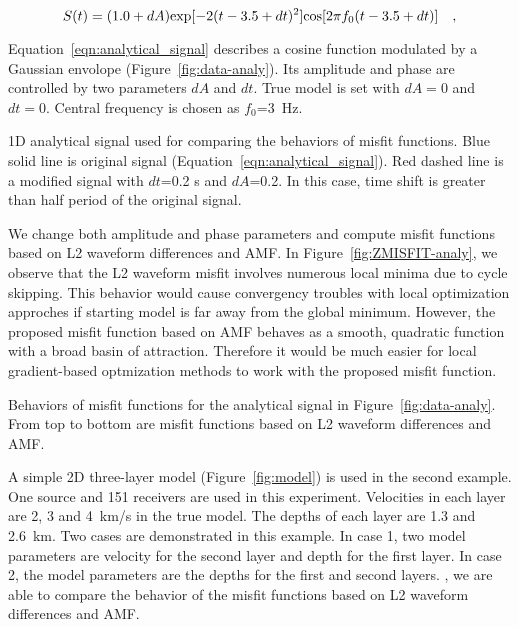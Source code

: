 \begin{equation}
\label{eqn:analytical_signal}
S(t)=(1.0+dA) {\rm exp}[-2(t-3.5+dt)^2]{\rm cos}[2\pi f_0(t-3.5+dt)]
\quad ,
\end{equation}

Equation~\ref{eqn:analytical_signal} describes a cosine function modulated by a Gaussian envolope (Figure~\ref{fig:data-analy}).
Its amplitude and phase are controlled by two parameters $dA$ and $dt$. 
True model is set with $dA=0$ and $dt=0$. Central frequency is chosen as $f_0$=3~Hz. 

{\label{fig:1d_data-analy}
1D analytical signal used for comparing the behaviors of misfit functions. 
Blue solid line is original signal (Equation~\ref{eqn:analytical_signal}).
Red dashed line is a modified signal with $dt$=0.2 s and $dA$=0.2. 
In this case, time shift is greater than half period of the original signal.}

We change both amplitude and phase parameters and compute misfit functions based on
L2 waveform differences and AMF. In Figure~\ref{fig:ZMISFIT-analy}, 
we observe that the L2 waveform misfit involves numerous local minima due to cycle 
skipping. This behavior would cause convergency troubles with local optimization approches if 
starting model is far away from the global minimum. However, the proposed misfit function
based on AMF behaves 
as a smooth, quadratic function with a broad basin of attraction. Therefore it would be much easier for local 
gradient-based optmization methods to work with the proposed misfit function.

{\label{fig:1d_misfit-analy}
Behaviors of misfit functions for the analytical signal in Figure~\ref{fig:data-analy}. 
From top to bottom are misfit functions based on L2 waveform differences and AMF.}

A simple 2D three-layer model (Figure~\ref{fig:model}) is used in the second example. 
One source and 151 receivers are used in this experiment. Velocities in each layer 
are 2, 3 and 4~km/s in the true model. The depths of each layer are 1.3 and 2.6~km. 
Two cases are demonstrated in this example. In case 1, two model parameters are velocity 
for the second layer and depth for the first layer. In case 2, the model parameters are 
the depths for the first and second layers. 
, we are able to compare the behavior of the misfit functions 
based on L2 waveform differences and AMF. 


